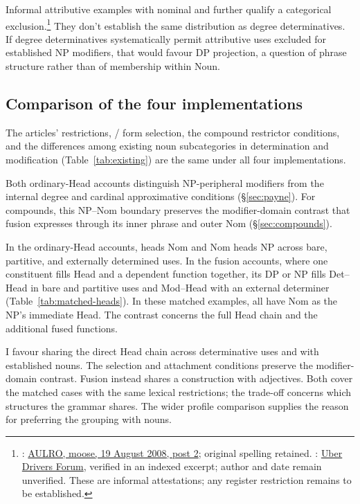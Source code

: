 \documentclass[12pt]{article}
\begin{document}
Informal attributive examples with nominal  and  further qualify a categorical exclusion.\footnote{: \href{https://www.aulro.com/afvb/motor-cycling/61858-my-track-day-phillip-island-motogp-track-post798794.html}{AULRO, moose, 19 August 2008, post 2}; original spelling retained. : \href{https://www.uberpeople.net/threads/let-s-play-would-you-have-taken-this-trip.395130/}{Uber Drivers Forum}, verified in an indexed excerpt; author and date remain unverified. These are informal attestations; any register restriction remains to be established.} They don't establish the same distribution as degree determinatives. If degree determinatives systematically permit attributive uses excluded for established NP modifiers, that would favour DP projection, a question of phrase structure rather than of membership within Noun.

\subsection{Comparison of the four implementations}\label{sec:costs}

The articles' restrictions, / form selection, the compound restrictor conditions, and the differences among existing noun subcategories in determination and modification (Table~\ref{tab:existing}) are the same under all four implementations.

Both ordinary-Head accounts distinguish NP-peripheral modifiers from the internal degree and cardinal approximative conditions (§\ref{sec:payne}). For compounds, this NP--Nom boundary preserves the modifier-domain contrast that fusion expresses through its inner phrase and outer Nom (§\ref{sec:compounds}).

In the ordinary-Head accounts,  heads Nom and Nom heads NP across bare, partitive, and externally determined uses. In the fusion accounts, where one constituent fills Head and a dependent function together, its DP or NP fills Det--Head in bare and partitive uses and Mod--Head with an external determiner (Table~\ref{tab:matched-heads}). In these matched examples, all have Nom as the NP's immediate Head. The contrast concerns the full Head chain and the additional fused functions.

I favour sharing the direct Head chain across determinative uses and with established nouns. The selection and attachment conditions preserve the modifier-domain contrast. Fusion instead shares a construction with adjectives. Both cover the matched cases with the same lexical restrictions; the trade-off concerns which structures the grammar shares. The wider profile comparison supplies the reason for preferring the grouping with nouns.
\end{document}
